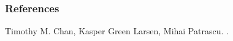 \documentclass[pdf]{beamer}
\begin{document}
\begin{frame}[allowframebreaks]
  \frametitle<presentation>{References}
    
  \begin{thebibliography}{10}
    
  \beamertemplatebookbibitems

    Timothy M. Chan, Kasper Green Larsen, Mihai Patrascu.
    .
 \end{thebibliography}
\end{frame}
\end{document}
